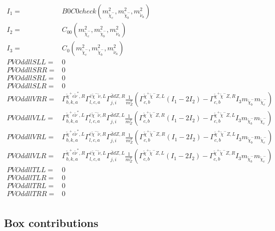 \documentclass[A4,landscape]{article}
\begin{document}
\begin{align} 
I_1= & B0C0check(m^2_{\tilde{\chi}^-_{{c}}}, m^2_{\tilde{\chi}^-_{{b}}}, m^2_{\tilde{\nu}_{{a}}}) \\ 
I_2= & C_{00}(m^2_{\tilde{\chi}^-_{{c}}}, m^2_{\tilde{\chi}^-_{{b}}}, m^2_{\tilde{\nu}_{{a}}}) \\ 
I_3= & C_0(m^2_{\tilde{\chi}^-_{{c}}}, m^2_{\tilde{\chi}^-_{{b}}}, m^2_{\tilde{\nu}_{{a}}}) \\ 
  PVOddllSLL= & 0 \\ 
  PVOddllSRR= & 0 \\ 
  PVOddllSRL= & 0 \\ 
  PVOddllSLR= & 0 \\ 
  PVOddllVRR= &  \Gamma^{\tilde{\chi}^+e \tilde{\nu}^*,R}_{b, k, a} \Gamma^{\bar{e}\tilde{\chi}^- \tilde{\nu} ,L}_{l, c, a} \Gamma^{\bar{d}d Z ,R}_{j, i} \frac{1}{m^2_{Z}} (\Gamma^{\tilde{\chi}^+\tilde{\chi}^- Z ,L}_{c, b} (I_1 - 2 I_2) - \Gamma^{\tilde{\chi}^+\tilde{\chi}^- Z ,R}_{c, b} I_3 m_{\tilde{\chi}^-_{{b}}} m_{\tilde{\chi}^-_{{c}}}) \\ 
  PVOddllVLL= &  \Gamma^{\tilde{\chi}^+e \tilde{\nu}^*,L}_{b, k, a} \Gamma^{\bar{e}\tilde{\chi}^- \tilde{\nu} ,R}_{l, c, a} \Gamma^{\bar{d}d Z ,L}_{j, i} \frac{1}{m^2_{Z}} (\Gamma^{\tilde{\chi}^+\tilde{\chi}^- Z ,R}_{c, b} (I_1 - 2 I_2) - \Gamma^{\tilde{\chi}^+\tilde{\chi}^- Z ,L}_{c, b} I_3 m_{\tilde{\chi}^-_{{b}}} m_{\tilde{\chi}^-_{{c}}}) \\ 
  PVOddllVRL= &  \Gamma^{\tilde{\chi}^+e \tilde{\nu}^*,L}_{b, k, a} \Gamma^{\bar{e}\tilde{\chi}^- \tilde{\nu} ,R}_{l, c, a} \Gamma^{\bar{d}d Z ,R}_{j, i} \frac{1}{m^2_{Z}} (\Gamma^{\tilde{\chi}^+\tilde{\chi}^- Z ,R}_{c, b} (I_1 - 2 I_2) - \Gamma^{\tilde{\chi}^+\tilde{\chi}^- Z ,L}_{c, b} I_3 m_{\tilde{\chi}^-_{{b}}} m_{\tilde{\chi}^-_{{c}}}) \\ 
  PVOddllVLR= &  \Gamma^{\tilde{\chi}^+e \tilde{\nu}^*,R}_{b, k, a} \Gamma^{\bar{e}\tilde{\chi}^- \tilde{\nu} ,L}_{l, c, a} \Gamma^{\bar{d}d Z ,L}_{j, i} \frac{1}{m^2_{Z}} (\Gamma^{\tilde{\chi}^+\tilde{\chi}^- Z ,L}_{c, b} (I_1 - 2 I_2) - \Gamma^{\tilde{\chi}^+\tilde{\chi}^- Z ,R}_{c, b} I_3 m_{\tilde{\chi}^-_{{b}}} m_{\tilde{\chi}^-_{{c}}}) \\ 
  PVOddllTLL= & 0 \\ 
  PVOddllTLR= & 0 \\ 
  PVOddllTRL= & 0 \\ 
  PVOddllTRR= & 0 \\ 
\end{align} 
\subsection{Box contributions} 
\end{document}
